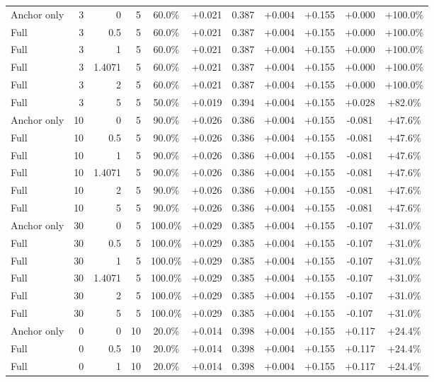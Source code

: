 \begin{table}[htbp]
\begin{tabular}{lrrrccccccc}
Anchor only & 3 & 0 & 5 & 60.0\% & +0.021 & 0.387 & +0.004 & +0.155 & +0.000 & +100.0\% \\
Full & 3 & 0.5 & 5 & 60.0\% & +0.021 & 0.387 & +0.004 & +0.155 & +0.000 & +100.0\% \\
Full & 3 & 1 & 5 & 60.0\% & +0.021 & 0.387 & +0.004 & +0.155 & +0.000 & +100.0\% \\
Full & 3 & 1.4071 & 5 & 60.0\% & +0.021 & 0.387 & +0.004 & +0.155 & +0.000 & +100.0\% \\
Full & 3 & 2 & 5 & 60.0\% & +0.021 & 0.387 & +0.004 & +0.155 & +0.000 & +100.0\% \\
Full & 3 & 5 & 5 & 50.0\% & +0.019 & 0.394 & +0.004 & +0.155 & +0.028 & +82.0\% \\
Anchor only & 10 & 0 & 5 & 90.0\% & +0.026 & 0.386 & +0.004 & +0.155 & -0.081 & +47.6\% \\
Full & 10 & 0.5 & 5 & 90.0\% & +0.026 & 0.386 & +0.004 & +0.155 & -0.081 & +47.6\% \\
Full & 10 & 1 & 5 & 90.0\% & +0.026 & 0.386 & +0.004 & +0.155 & -0.081 & +47.6\% \\
Full & 10 & 1.4071 & 5 & 90.0\% & +0.026 & 0.386 & +0.004 & +0.155 & -0.081 & +47.6\% \\
Full & 10 & 2 & 5 & 90.0\% & +0.026 & 0.386 & +0.004 & +0.155 & -0.081 & +47.6\% \\
Full & 10 & 5 & 5 & 90.0\% & +0.026 & 0.386 & +0.004 & +0.155 & -0.081 & +47.6\% \\
Anchor only & 30 & 0 & 5 & 100.0\% & +0.029 & 0.385 & +0.004 & +0.155 & -0.107 & +31.0\% \\
Full & 30 & 0.5 & 5 & 100.0\% & +0.029 & 0.385 & +0.004 & +0.155 & -0.107 & +31.0\% \\
Full & 30 & 1 & 5 & 100.0\% & +0.029 & 0.385 & +0.004 & +0.155 & -0.107 & +31.0\% \\
Full & 30 & 1.4071 & 5 & 100.0\% & +0.029 & 0.385 & +0.004 & +0.155 & -0.107 & +31.0\% \\
Full & 30 & 2 & 5 & 100.0\% & +0.029 & 0.385 & +0.004 & +0.155 & -0.107 & +31.0\% \\
Full & 30 & 5 & 5 & 100.0\% & +0.029 & 0.385 & +0.004 & +0.155 & -0.107 & +31.0\% \\
Anchor only & 0 & 0 & 10 & 20.0\% & +0.014 & 0.398 & +0.004 & +0.155 & +0.117 & +24.4\% \\
Full & 0 & 0.5 & 10 & 20.0\% & +0.014 & 0.398 & +0.004 & +0.155 & +0.117 & +24.4\% \\
Full & 0 & 1 & 10 & 20.0\% & +0.014 & 0.398 & +0.004 & +0.155 & +0.117 & +24.4\% \\

\end{tabular}
\end{table}
